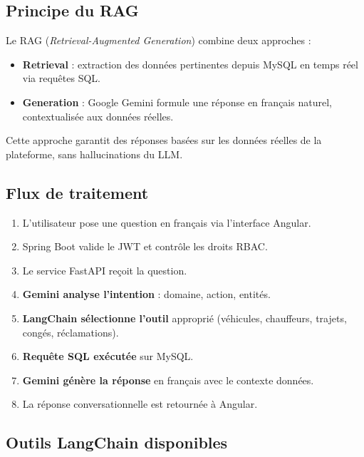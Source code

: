 \documentclass[12pt,a4paper]{report}
\begin{document}
\subsection{Principe du RAG}

Le RAG (\textit{Retrieval-Augmented Generation}) combine deux approches :
\begin{itemize}
  \item \textbf{Retrieval} : extraction des données pertinentes
        depuis MySQL en temps réel via requêtes SQL.
  \item \textbf{Generation} : Google Gemini formule une réponse
        en français naturel, contextualisée aux données réelles.
\end{itemize}

Cette approche garantit des réponses basées sur les données réelles
de la plateforme, sans hallucinations du LLM.

\subsection{Flux de traitement}

\begin{enumerate}
  \item L'utilisateur pose une question en français via l'interface Angular.
  \item Spring Boot valide le JWT et contrôle les droits RBAC.
  \item Le service FastAPI reçoit la question.
  \item \textbf{Gemini analyse l'intention} : domaine, action, entités.
  \item \textbf{LangChain sélectionne l'outil} approprié
        (véhicules, chauffeurs, trajets, congés, réclamations).
  \item \textbf{Requête SQL exécutée} sur MySQL.
  \item \textbf{Gemini génère la réponse} en français avec le contexte données.
  \item La réponse conversationnelle est retournée à Angular.
\end{enumerate}

\subsection{Outils LangChain disponibles}
\end{document}
